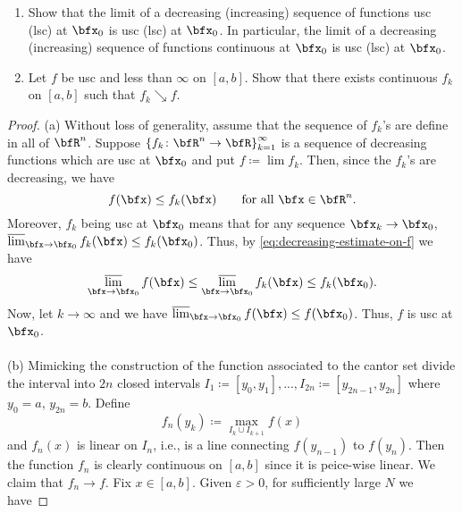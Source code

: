 \begin{problem}
\begin{enumerate}[label=(\alph*)]
\item Show that the limit of a decreasing (increasing) sequence of
  functions usc (lsc) at $\bfx_0$ is usc (lsc) at $\bfx_0$. In particular,
  the limit of a decreasing (increasing) sequence of functions continuous
  at $\bfx_0$ is usc (lsc) at $\bfx_0$.
\item Let $f$ be usc and less than $\infty$ on $[a,b]$. Show that there
  exists continuous $f_k$ on $[a,b]$ such that $f_k\searrow f$.
\end{enumerate}
\end{problem}
\begin{proof}
(a) Without loss of generality, assume that the sequence of $f_k$'s are
define in all of $\bfR^n$. Suppose
$\left\{f_k\colon\bfR^n\to\bfR\right\}_{k=1}^\infty$ is a sequence of
decreasing functions which are usc at $\bfx_0$ and put $f\coloneqq\lim
f_k$. Then, since the $f_k$'s are decreasing, we have
\begin{equation}
  \label{eq:decreasing-estimate-on-f}
f(\bfx)\leq f_k(\bfx)\qquad\text{for all $\bfx\in\bfR^n$.}
\end{equation}
Moreover, $f_k$ being usc at $\bfx_0$ means that for any sequence
$\bfx_k\to\bfx_0$, $\varlimsup_{\bfx\to\bfx_0} f_k(\bfx)\leq
f_k(\bfx_0)$. Thus, by \eqref{eq:decreasing-estimate-on-f} we have
\begin{equation}
  \label{eq:limit-estimate-on-f}
\varlimsup_{\bfx\to\bfx_0}f(\bfx)\leq\varlimsup_{\bfx\to\bfx_0}
f_k(\bfx)\leq f_k(\bfx_0).
\end{equation}
Now, let $k\to\infty$ and we have $\varlimsup_{\bfx\to\bfx_0} f(\bfx)\leq
f(\bfx_0)$. Thus, $f$ is usc at $\bfx_0$.
\\\\
(b) Mimicking the construction of the function associated to the cantor set
divide the interval into $2n$ closed intervals
$I_1\coloneqq[y_0,y_1],...,I_{2n}\coloneqq[y_{2n-1},y_{2n}]$ where $y_0=a$,
$y_{2n}=b$. Define
\begin{equation}
  \label{eq:define-fn}
f_n(y_k)\coloneqq\max_{I_{k}\cup I_{k+1}} f(x)
\end{equation}
and $f_n(x)$ is linear on $I_n$, i.e., is a line connecting $f(y_{n-1})$ to
$f(y_n)$. Then the function $f_n$ is clearly continuous on $[a,b]$ since it
is peice-wise linear. We claim that $f_n\to f$. Fix $x\in[a,b]$. Given
$\varepsilon>0$, for sufficiently large $N$ we have
\end{proof}
\newpage

